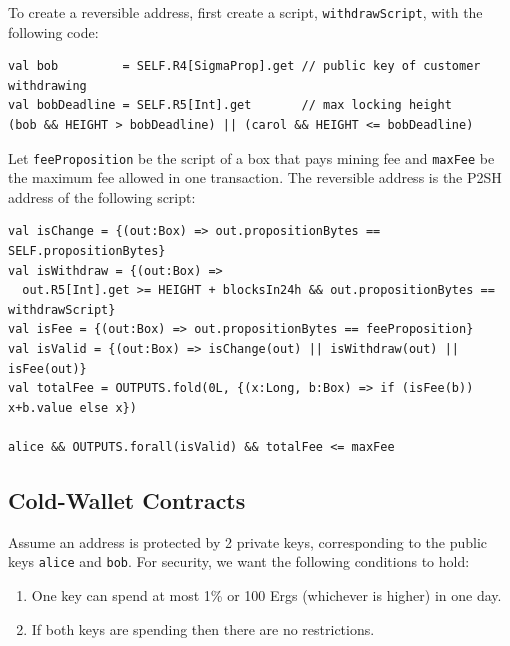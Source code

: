 \documentclass[11pt]{article}
\begin{document}
To create a reversible address, first create a script, \texttt{withdrawScript}, with the following code:
\begin{verbatim}
val bob         = SELF.R4[SigmaProp].get // public key of customer withdrawing
val bobDeadline = SELF.R5[Int].get       // max locking height
(bob && HEIGHT > bobDeadline) || (carol && HEIGHT <= bobDeadline)
\end{verbatim}

Let \texttt{feeProposition} be the script of a box that pays mining fee and \texttt{maxFee} be the maximum fee allowed in one transaction. The reversible address is the P2SH address of the following script:
\begin{verbatim}
val isChange = {(out:Box) => out.propositionBytes == SELF.propositionBytes}
val isWithdraw = {(out:Box) => 
  out.R5[Int].get >= HEIGHT + blocksIn24h && out.propositionBytes == withdrawScript}
val isFee = {(out:Box) => out.propositionBytes == feeProposition}
val isValid = {(out:Box) => isChange(out) || isWithdraw(out) || isFee(out)}
val totalFee = OUTPUTS.fold(0L, {(x:Long, b:Box) => if (isFee(b)) x+b.value else x})

alice && OUTPUTS.forall(isValid) && totalFee <= maxFee
\end{verbatim}

\subsection{Cold-Wallet Contracts}

Assume an address is protected by 2 private keys, corresponding to the public keys \texttt{alice} and \texttt{bob}. For security, we want the following conditions to hold:

\begin{enumerate}
	\item One key can spend at most 1\% or 100 Ergs (whichever is higher) in one day.
	\item If both keys are spending then there are no restrictions. 
\end{enumerate}
\end{document}

